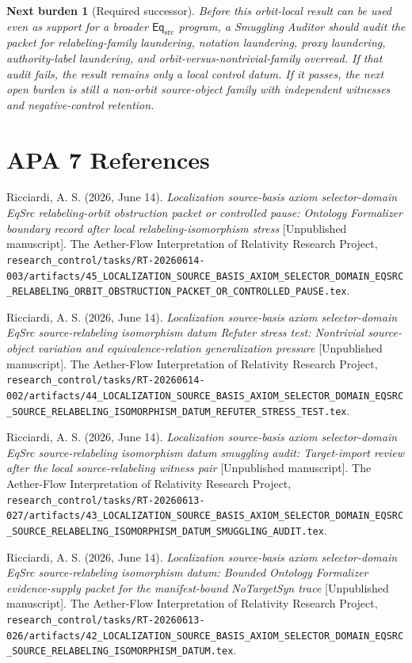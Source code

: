 \documentclass[11pt]{article}
\newcommand{\EqSrc}{\mathsf{Eq}_{\mathrm{src}}}
\newtheorem{nextburden}{Next burden}
\begin{document}
\begin{nextburden}[Required successor]
Before this orbit-local result can be used even as support for a broader
\(\EqSrc\) program, a Smuggling Auditor should audit the packet for
relabeling-family laundering, notation laundering, proxy laundering,
authority-label laundering, and orbit-versus-nontrivial-family overread.
If that audit fails, the result remains only a local control datum. If it
passes, the next open burden is still a non-orbit source-object family with
independent witnesses and negative-control retention.
\end{nextburden}

\section*{APA 7 References}

Ricciardi, A. S. (2026, June 14). \textit{Localization source-basis axiom
selector-domain EqSrc relabeling-orbit obstruction packet or controlled
pause: Ontology Formalizer boundary record after local
relabeling-isomorphism stress} [Unpublished manuscript]. The Aether-Flow
Interpretation of Relativity Research Project,
\texttt{research\_control/tasks/RT-20260614-003/artifacts/45\_LOCALIZATION\_SOURCE\_BASIS\_AXIOM\_SELECTOR\_DOMAIN\_EQSRC\_RELABELING\_ORBIT\_OBSTRUCTION\_PACKET\_OR\_CONTROLLED\_PAUSE.tex}.

Ricciardi, A. S. (2026, June 14). \textit{Localization source-basis axiom
selector-domain EqSrc source-relabeling isomorphism datum Refuter stress
test: Nontrivial source-object variation and equivalence-relation
generalization pressure} [Unpublished manuscript]. The Aether-Flow
Interpretation of Relativity Research Project,
\texttt{research\_control/tasks/RT-20260614-002/artifacts/44\_LOCALIZATION\_SOURCE\_BASIS\_AXIOM\_SELECTOR\_DOMAIN\_EQSRC\_SOURCE\_RELABELING\_ISOMORPHISM\_DATUM\_REFUTER\_STRESS\_TEST.tex}.

Ricciardi, A. S. (2026, June 14). \textit{Localization source-basis axiom
selector-domain EqSrc source-relabeling isomorphism datum smuggling audit:
Target-import review after the local source-relabeling witness pair}
[Unpublished manuscript]. The Aether-Flow Interpretation of Relativity
Research Project,
\texttt{research\_control/tasks/RT-20260613-027/artifacts/43\_LOCALIZATION\_SOURCE\_BASIS\_AXIOM\_SELECTOR\_DOMAIN\_EQSRC\_SOURCE\_RELABELING\_ISOMORPHISM\_DATUM\_SMUGGLING\_AUDIT.tex}.

Ricciardi, A. S. (2026, June 14). \textit{Localization source-basis axiom
selector-domain EqSrc source-relabeling isomorphism datum: Bounded
Ontology Formalizer evidence-supply packet for the manifest-bound
NoTargetSyn trace} [Unpublished manuscript]. The Aether-Flow
Interpretation of Relativity Research Project,
\texttt{research\_control/tasks/RT-20260613-026/artifacts/42\_LOCALIZATION\_SOURCE\_BASIS\_AXIOM\_SELECTOR\_DOMAIN\_EQSRC\_SOURCE\_RELABELING\_ISOMORPHISM\_DATUM.tex}.
\end{document}
